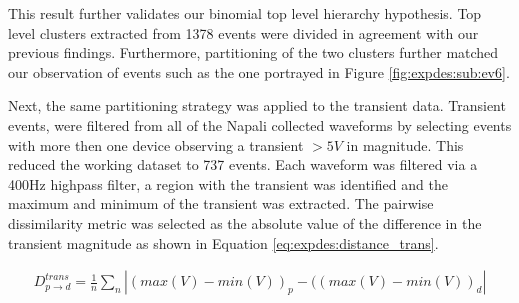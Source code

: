 This result further validates our binomial top level hierarchy hypothesis.
Top level clusters extracted from 1378 events were divided in agreement with our previous findings.
Furthermore, partitioning of the two clusters further matched our observation of events such as the one portrayed in Figure \ref{fig:expdes:sub:ev6}.

Next, the same partitioning strategy was applied to the transient data.
Transient events, were filtered from all of the Napali collected waveforms by selecting events with more then one device observing a transient $>5V$ in magnitude.
This reduced the working dataset to 737 events.
Each waveform was filtered via a 400Hz highpass filter, a region with the transient was identified and the maximum and minimum of the transient was extracted.
The pairwise dissimilarity metric was selected as the absolute value of the difference in the transient magnitude as shown in Equation \ref{eq:expdes:distance_trans}.

\begin{equation} \label{eq:expdes:distance_trans}
\begin{aligned}
    D_{p \rightarrow d}^{trans} = \frac{1}{n}\sum_{n}|(max(V) - min(V))_{p} - ((max(V) - min(V))_{d}|
\end{aligned}
\end{equation}

